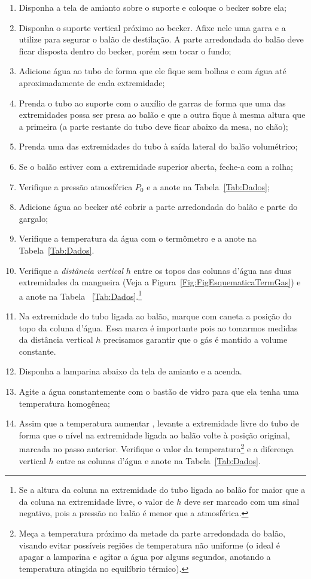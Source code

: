 \begin{enumerate}
\item Disponha a tela de amianto sobre o suporte e coloque o becker sobre ela;
\item Disponha o suporte vertical próximo ao becker. Afixe nele uma garra e a utilize para segurar o balão de destilação. A parte arredondada do balão deve ficar disposta dentro do becker, porém sem tocar o fundo;
\item Adicione água ao tubo de forma que ele fique sem bolhas e com água até aproximadamente  de cada extremidade;
\item Prenda o tubo ao suporte com o auxílio de garras de forma que uma das extremidades possa ser presa ao balão e que a outra fique à mesma altura que a primeira (a parte restante do tubo deve ficar abaixo da mesa, no chão);
\item Prenda uma das extremidades do tubo à saída lateral do balão volumétrico;
\item Se o balão estiver com a extremidade superior aberta, feche-a com a rolha;
\item Verifique a pressão atmosférica $P_0$ e a anote na Tabela~\ref{Tab:Dados};
\item Adicione água ao becker até cobrir a parte arredondada do balão e parte do gargalo;
\item Verifique a temperatura da água com o termômetro e a anote na Tabela~\ref{Tab:Dados}.
\item Verifique a \emph{distância vertical} $h$ entre os topos das colunas d'água nas duas extremidades da mangueira (Veja a Figura~\ref{Fig:FigEsquematicaTermGas}) e a anote na Tabela~
\ref{Tab:Dados}.\footnote{Se a altura da coluna na extremidade do tubo ligada ao balão for maior que a da coluna na extremidade livre, o valor de $h$ deve ser marcado com um sinal negativo, pois a pressão no balão é menor que a atmosférica.}
\item Na extremidade do tubo ligada ao balão, marque com caneta a posição do topo da coluna d'água. Essa marca é importante pois ao tomarmos medidas da distância vertical $h$ precisamos garantir que o gás é mantido a volume constante.
\item Disponha a lamparina abaixo da tela de amianto e a acenda.
\item Agite a água constantemente com o bastão de vidro para que ela tenha uma temperatura homogênea; 
\item Assim que a temperatura aumentar , levante a extremidade livre do tubo de forma que o nível na extremidade ligada ao balão volte à posição original, marcada no passo anterior. Verifique o valor da temperatura\footnote{Meça a temperatura próximo da metade da parte arredondada do balão, visando evitar possíveis regiões de temperatura não uniforme (o ideal é apagar a lamparina e agitar a água por alguns segundos, anotando a temperatura atingida no equilíbrio térmico).} e a diferença vertical $h$ entre as colunas d'água e anote na Tabela~\ref{Tab:Dados}.

\end{enumerate}
